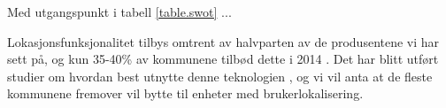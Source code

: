 Med utgangspunkt i tabell \vref{table.swot} ...

Lokasjonsfunksjonalitet tilbys omtrent av halvparten av de produsentene vi har
sett på, og kun 35-40\%{} av kommunene tilbød dette i 2014
\cite{org.alarmmottak}.  Det har blitt utført studier om hvordan best utnytte
denne teknologien \cite{sintef.trygge.spor}, og vi vil anta at de fleste
kommunene fremover vil bytte til enheter med brukerlokalisering.




